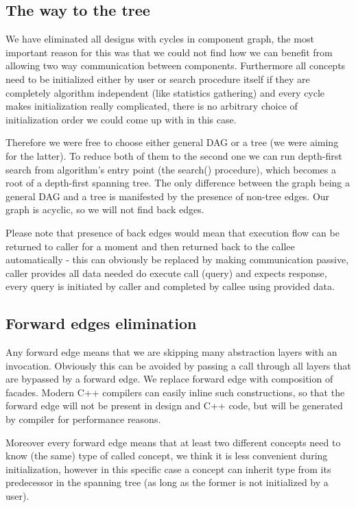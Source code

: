 \subsection{The way to the tree}
We have eliminated all designs with cycles in component graph, the most
important reason for this was that we could not find how we can benefit from
allowing two way communication between components. Furthermore all concepts
need to be initialized either by user or search procedure itself if they are
completely algorithm independent (like statistics gathering) and every cycle
makes initialization really complicated, there is no arbitrary choice of
initialization order we could come up with in this case.

Therefore we were free to choose either general DAG or a tree (we were aiming
for the latter). To reduce both of them to the second one we can run
depth-first search from algorithm's entry point (the search() procedure), which
becomes a root of a depth-first spanning tree. The only difference between the
graph being a general DAG and a tree is manifested by the presence of non-tree
edges. Our graph is acyclic, so we will not find back edges.

Please note that presence of back edges would mean that execution flow can be
returned to caller for a moment and then returned back to the callee
automatically - this can obviously be replaced by making communication
passive, caller provides all data needed do execute call (query) and expects
response, every query is initiated by caller and completed by callee using
provided data.

\subsection{Forward edges elimination}
Any forward edge means that we are skipping many abstraction layers with an
invocation. Obviously this can be avoided by passing a call through all layers
that are bypassed by a forward edge. We replace forward edge with composition
of facades. Modern C++ compilers can easily inline such constructions, so that
the forward edge will not be present in design and C++ code, but will be
generated by compiler for performance reasons.

Moreover every forward edge means that at least two different concepts need to
know (the same) type of called concept, we think it is less convenient during
initialization, however in this specific case a concept can inherit type from
its predecessor in the spanning tree (as long as the former is not initialized
by a user).

